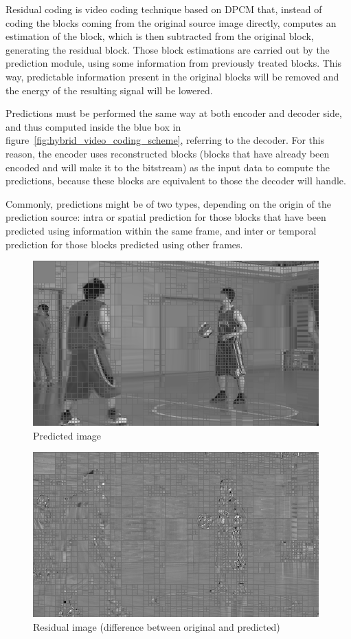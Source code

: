 \documentclass[11pt,a4paper,openright,twoside]{book}
\numberwithin{equation}{section} %
\numberwithin{figure}{section} %
\numberwithin{table}{section} %
\begin{document}
Residual coding is video coding technique based on \ac{DPCM} that,
instead of coding the blocks coming from the original source image
directly, computes an estimation of the block, which is then subtracted
from the original block, generating the residual block.
Those block estimations are carried out by the prediction module, using
some information from previously treated blocks.
This way, predictable information present in the original blocks will be
removed and the energy of the resulting signal will be lowered.

Predictions must be performed the same way at both encoder and decoder
side, and thus computed inside the blue box in
figure~\ref{fig:hybrid_video_coding_scheme}, referring to the decoder.
For this reason, the encoder uses reconstructed blocks (blocks that have
already been encoded and will make it to the bitstream) as the input
data to compute the predictions, because these blocks are equivalent to
those the decoder will handle.

Commonly, predictions might be of two types, depending on the origin of
the prediction source:
intra or spatial prediction for those blocks that
have been predicted using information within the same frame, and inter
or temporal prediction for those blocks predicted using other frames.

\begin{figure}[tb]
	\centering
	\includegraphics[width=0.6\linewidth]{./figures/partitioning-pred-all-001.png}
	\caption{Predicted image}
	\label{fig:predicted_image}
\end{figure}

\begin{figure}[tb]
	\centering
	\includegraphics[width=0.6\linewidth]{./figures/partitioning-resi-all-001.png}
	\caption{Residual image (difference between original and predicted)}
	\label{fig:residual_image}
\end{figure}
\end{document}
